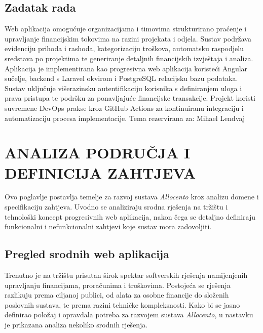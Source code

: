 \documentclass[a4paper,12pt,oneside]{article}
\begin{document}
	\subsection{Zadatak rada}
	Web aplikacija omogućuje organizacijama i timovima strukturirano praćenje i upravljanje financijskim tokovima na razini projekata i odjela. Sustav podržava evidenciju prihoda i rashoda, kategorizaciju troškova, automatsku raspodjelu sredstava po projektima te generiranje detaljnih financijskih izvještaja i analiza. Aplikacija je implementirana kao progresivna web aplikacija koristeći Angular sučelje, backend s Laravel okvirom i PostgreSQL relacijsku bazu podataka. Sustav uključuje višerazinsku autentifikaciju korisnika s definiranjem uloga i prava pristupa te podršku za ponavljajuće financijske transakcije. Projekt koristi suvremene DevOps prakse kroz GitHub Actions za kontinuiranu integraciju i automatizaciju procesa implementacije. Tema rezervirana za: Mihael Lendvaj
		

	
	
	\newpage
	\section{ANALIZA PODRUČJA I DEFINICIJA ZAHTJEVA}
	
	Ovo poglavlje postavlja temelje za razvoj sustava \textit{Allocento} kroz analizu domene i specifikaciju zahtjeva. Uvodno se analiziraju srodna rješenja na tržištu i tehnološki koncept progresivnih web aplikacija, nakon čega se detaljno definiraju funkcionalni i nefunkcionalni zahtjevi koje sustav mora zadovoljiti.
	
	\subsection{Pregled srodnih web aplikacija}
	
	Trenutno je na tržištu prisutan širok spektar softverskih rješenja namijenjenih upravljanju financijama, proračunima i troškovima. Postojeća se rješenja razlikuju prema ciljanoj publici, od alata za osobne financije do složenih poslovnih sustava, te prema razini tehničke kompleksnosti. Kako bi se jasno definirao položaj i opravdala potreba za razvojem sustava \textit{Allocento}, u nastavku je prikazana analiza nekoliko srodnih rješenja.
	
\end{document}
